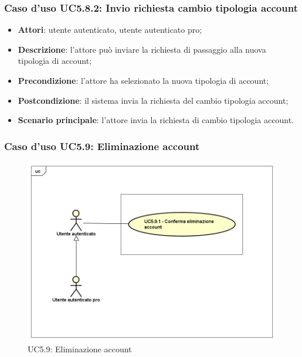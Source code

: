 \subsubsection{Caso d'uso UC5.8.2: Invio richiesta cambio tipologia account}

\begin{itemize}
	\item \textbf{Attori}: utente autenticato, utente autenticato pro;
	\item \textbf{Descrizione}: l'attore può inviare la richiesta di passaggio alla nuova tipologia di account;
	\item \textbf{Precondizione}: l'attore ha selezionato la nuova tipologia di account;
	\item \textbf{Postcondizione}: il sistema invia la richiesta del cambio tipologia account;
	\item \textbf{Scenario principale}: l'attore invia la richiesta di cambio tipologia account.
\end{itemize}

\subsubsection{Caso d'uso UC5.9: Eliminazione account}
\label{UC5.9}
\begin{figure}[h]
	\centering
	\includegraphics[scale=0.5,keepaspectratio]{UML/UC5_9.png}
	\caption{UC5.9: Eliminazione account}
\end{figure}

